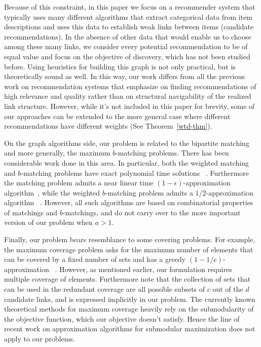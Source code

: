 Because of this constraint, in this paper we focus on a recommender system that typically uses many different algorithms that extract categorical data from item descriptions and uses this data to establish weak links between items (candidate recommendations). In the absence of other data that would enable us to choose among these many links, we consider every potential recommendation to be of equal value and focus on the objective of discovery, which has not been studied before. Using heuristics for building this graph is not only practical, but is theoretically sound as well\cite{sarkar2011theoretical}. In this way, our work differs from all the previous work on recommendation systems that emphasize on finding recommendations of high relevance and quality rather than on structural navigability of the realized link structure. However, while it's not included in this paper for brevity, some of our approaches can be extended to the more general case where different recommendations have different weights (See Theorem~\ref{wtd-thm}). \vs

On the graph algorithms side, our problem is related to the bipartite matching and more generally, the maximum $b$-matching problems. There has been considerable work done in this area.
In particular, both the weighted matching and $b$-matching problems have exact polynomial time solutions ~\cite{Gabow1983}. Furthermore the matching problem admits a near linear time $(1-\epsilon)$-approximation algorithm~\cite{duan2010approximating}, while the weighted $b$-matching problem admits a $1/2$-approximation algorithm ~\cite{koufogiannakis2009distributed}. However, all such algorithms are based on combinatorial properties of matchings and $b$-matchings, and do not carry over to the more important version of our problem when $a > 1$.

Finally, our problem bears resemblance to some covering problems. For example, the maximum coverage problem asks for the maximum number of elements that can be covered by a fixed number of sets and has a greedy $(1-1/e)$-approximation ~\cite{nemhauser1978analysis}. However, as mentioned earlier, our formulation requires multiple coverage of elements. Furthermore note that the collection of sets that can be used in the redundant coverage are all possible subsets of $c$ out of the $d$ candidate links, and is expressed implicitly in our problem.  The currently known theoretical methods for maximum coverage heavily rely on the submodularity of the objective function, which our objective doesn't satisfy. Hence the line of recent work on approximation algorithms for submodular maximization does not apply to our problems. 